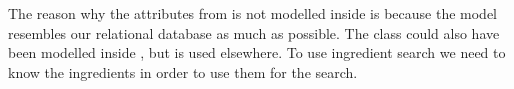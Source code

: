 The reason why the attributes from  is not modelled inside  is because the model resembles our relational database as much as possible. The  class could also have been modelled inside , but  is used elsewhere. To use ingredient search we need to know the ingredients in order to use them for the search.